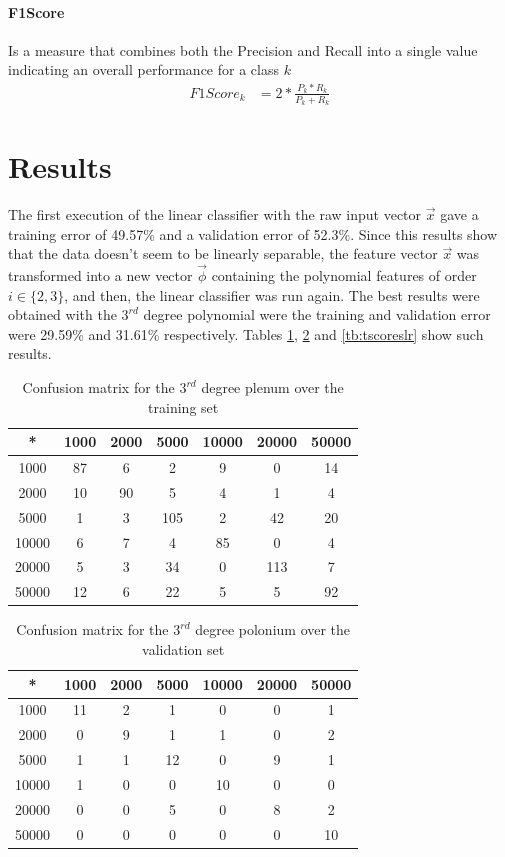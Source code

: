 \documentclass{IEEEtran}
\begin{document}
\paragraph{F1Score} 
Is a measure that combines both the Precision and Recall into a single value indicating an overall performance for a class $k$ 
\begin{align}
F1Score_k &= 2 * \frac{P_k*R_k}{P_k+R_k} \label{eq:f1score}
\end{align}


\section{Results}
The first execution of the linear classifier with the raw input vector $\vec{x}$ gave a training error of 49.57\%
and a validation error of 52.3\%. Since this results show that the data doesn't seem to be linearly separable, 
the feature vector $\vec{x}$ was transformed into a new vector $\vec{\phi}$ containing the polynomial features of 
order $i \in \{2,3\}$, and then, the linear classifier was run again. The best results were obtained with the
$3^{rd}$ degree polynomial were the training and validation error were 29.59\% and 31.61\%  respectively. 
Tables \ref{tb:tconfmlr}, \ref{tb:vconfmlr} and \ref{tb:tscoreslr} show such results.

\begin{table}
\centering
\begin{tabular}{|c|c|c|c|c|c|c|}
\hline
* & 1000 & 2000 & 5000 & 10000 & 20000 & 50000 \\
\hline
1000 &  87 &   6 &   2 &   9 &   0 &  14 \\
2000 &  10 &  90 &   5 &   4 &   1 &   4 \\
5000 &   1 &   3 & 105 &   2 &  42 &  20 \\
10000 &   6 &   7 &   4 &  85 &   0 &   4 \\
20000 &   5 &   3 &  34 &   0 & 113 &   7 \\
50000 &  12 &   6 &  22 &   5 &   5 &  92 \\
\hline
\end{tabular}
\caption{Confusion matrix for the $3^{rd}$ degree plenum over the training set}
\label{tb:tconfmlr}
\end{table}

\begin{table}
\centering
\begin{tabular}{|c|c|c|c|c|c|c|}
\hline
* & 1000 & 2000 & 5000 & 10000 & 20000 & 50000 \\
\hline
1000 &  11 &  2 &  1 &  0 &  0 &  1 \\
2000 &  0 &  9 &  1 &  1 &  0 &  2 \\
5000 &  1 &  1 & 12 &  0 &  9 &  1 \\
10000 &  1 &  0 &  0 & 10 &  0 &  0 \\
20000 &  0 &  0 &  5 &  0 &  8 &  2 \\
50000 &  0 &  0 &  0 &  0 &  0 & 10 \\
\hline
\end{tabular}
\caption{Confusion matrix for the $3^{rd}$ degree polonium over the validation set}
\label{tb:vconfmlr}
\end{table}
\end{document}
